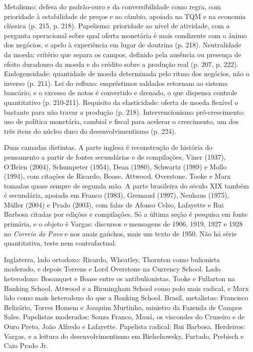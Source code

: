 
Metalismo: defesa do padrão-ouro e da conversibilidade como regra, com
prioridade à estabilidade de preços e ao câmbio, apoiada na TQM e na economia
clássica (p. 215, p. 218). Papelismo: prioridade ao nível de atividade, com a
pergunta operacional sobre qual oferta monetária é mais condizente com o ânimo
dos negócios, e apelo à experiência em lugar de doutrina (p. 218). Neutralidade
da moeda: critério que separa os campos, definido pela ausência ou presença de
efeito duradouro da moeda e do crédito sobre a produção real (p. 207, p. 222).
Endogeneidade: quantidade de moeda determinada pelo ritmo dos negócios, não o
inverso (p. 211). Lei do refluxo: empréstimos saldados retornam ao sistema
bancário, e o excesso de notas é convertido e drenado, o que dispensa controle
quantitativo (p. 210-211). Requisito da elasticidade: oferta de moeda flexível
o bastante para não travar a produção (p. 218). Intervencionismo
pró-crescimento: uso de política monetária, cambial e fiscal para acelerar o
crescimento, um dos três itens do núcleo duro do desenvolvimentismo (p. 224).

Duas camadas distintas. A parte inglesa é reconstrução de história do
pensamento a partir de fontes secundárias e de compilações, Viner (1937),
O'Brien (2004), Schumpeter (1954), Dean (1980), Schwartz (1989) e Mollo
(1994), com citações de Ricardo, Boase, Attwood, Overstone, Tooke e Marx
tomadas quase sempre de segunda mão. A parte brasileira do século XIX também é
secundária, apoiada em Franco (1983), Gremaud (1997), Neuhaus (1975), Müller
(2004) e Prado (2003), com falas de Afonso Celso, Lafayette e Rui Barbosa
citadas por edições e compilações. Só a última seção é pesquisa em fonte
primária, e o objeto é Vargas: discursos e mensagens de 1906, 1919, 1927 e
1928 no \emph{Correio do Povo} e nos anais gaúchos, mais um texto de 1950. Não
há série quantitativa, teste nem contrafactual.

Inglaterra, lado ortodoxo: Ricardo, Wheatley, Thornton como bulionista
moderado, e depois Torrens e Lord Overstone na Currency School. Lado
heterodoxo: Bosanquet e Boase entre os antibulionistas, Tooke e Fullarton na
Banking School, Attwood e a Birmingham School como polo mais radical, e Marx
lido como mais heterodoxo do que a Banking School. Brasil, metalistas:
Francisco Belizário, Torres Homem e Joaquim Murtinho, ministro da Fazenda de
Campos Sales. Papelistas moderados: Souza Franco, Mauá, os viscondes do
Cruzeiro e de Ouro Preto, João Alfredo e Lafayette. Papelista radical: Rui
Barbosa. Herdeiros: Vargas, e a leitura do desenvolvimentismo em Bielschowsky,
Furtado, Prebisch e Caio Prado Jr.

